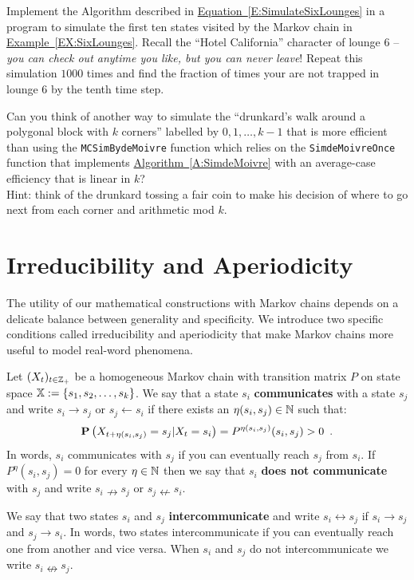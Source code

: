 \begin{simulation}\label{SIM:TrappedinLounge6}
Implement the Algorithm described in \hyperref[E:SimulateSixLounges]{Equation~\ref*{E:SimulateSixLounges}} in a \Matlab program to simulate the first ten states visited by the Markov chain in \hyperref[EX:SixLounges]{Example~\ref*{EX:SixLounges}}.  Recall the ``Hotel California'' character of  lounge $6$ -- {\em  you can check out anytime you like, but you can never leave}!  Repeat this simulation $1000$ times and find the fraction of times your are not trapped in lounge $6$ by the  tenth time step. 
\end{simulation}

\begin{exercise}\label{EXR:DrunkardWalkOnKGon}
Can you think of another way to simulate the ``drunkard's walk around a polygonal block with $k$ corners'' labelled by $0,1,\ldots, k-1$ that is more efficient than using the {\tt MCSimBydeMoivre} function which  relies on the {\tt SimdeMoivreOnce} function that implements \hyperref[A:SimdeMoivre]{Algorithm~\ref*{A:SimdeMoivre}} with an average-case efficiency that is linear in $k$?\\  {\scriptsize Hint: think of the drunkard tossing a fair coin to make his decision of where to go next from each corner and arithmetic mod $k$.}
\end{exercise}

\section{Irreducibility and Aperiodicity}\label{S:IrredAperiod}
The utility of our mathematical constructions with Markov chains depends on a delicate balance between generality and specificity.  We introduce two specific conditions called irreducibility and aperiodicity that make Markov chains more useful to model real-word phenomena.


\begin{definition}\label{D:Communication} Let $(X_t)_{t\in\mathbb{Z}_+}$ be a homogeneous Markov chain with transition matrix $P$ on state space $\mathbb{X}:=\{s_1,s_2,\ldots,s_k\}$.  
We say that a state $s_i$ {\bf communicates} with a state $s_j$ and write $s_i \rightarrow s_j$ or $s_j \leftarrow s_i$ if there exists an $\eta(s_i,s_j) \in \mathbb{N}$ such that:
\[
\mathbf{P} \left( X_{t+\eta(s_i,s_j)} = s_j | X_t = s_i \right) = P^{\eta(s_i,s_j)} (s_i, s_j) > 0 \enspace .
\] 
In words, $s_i$ communicates with $s_j$ if you can eventually reach $s_j$ from $s_i$.  If $P^{\eta} (s_i, s_j)=0$ for every $\eta \in \mathbb{N}$ then we say that $s_i$ {\bf does not communicate} with $s_j$ and write $s_i  \nrightarrow s_j$ or $s_j  \nleftarrow s_i$.

We say that two states $s_i$ and $s_j$ {\bf intercommunicate} and write $s_i \leftrightarrow s_j$ if $s_i \rightarrow s_j$ and $s_j \rightarrow s_i$.  In words, two states intercommunicate if you can eventually reach one from another and vice versa.  When $s_i$ and $s_j$ do not intercommunicate we write $s_i \nleftrightarrow s_j$.
\end{definition}


